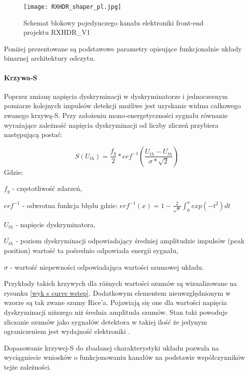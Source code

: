 \begin{figure}
        \texttt{[image: RXHDR\_shaper\_pl.jpg]}
        \caption{Schemat blokowy pojedynczego kanału elektroniki front-end projektu RXHDR\_V1}
        \label{RXHDR schema}
\end{figure}

Poniżej prezentowane są podstawowe parametry opisujące funkcjonalnie układy binarnej architektury odczytu.

\paragraph{Krzywa-S}

Poprzez zmianę napięcia dyskryminacji w dyskryminatorze i jednoczesnym  pomiarze kolejnych impulsów detekcji możliwe jest uzyskanie widma całkowego zwanego krzywą-S. Przy założeniu mono-energetyczności sygnału równanie wyrażające zależność napięcia dyskryminacji od liczby zliczeń przybiera następującą postać:

\begin{equation}
        \label{wste krzywa s}
        S(U_{th}) = \frac{f_g}{2} * erf^{-1}(\frac{U_{th}-\overline{U_{th}}}{\sigma*\sqrt{2}})
\end{equation}
Gdzie:
\begin{description}
        \item $f_g$ - częstotliwość zdarzeń,
        \item $erf^{-1}$ - odwrotna funkcja błędu gdzie: $erf^{-1}(x) = 1 - \frac{2}{\sqrt{\pi}} \int^x_0 exp(-t^2)dt $
        \item $U_{th}$ - napięcie dyskryminatora,
        \item $\overline{U_{th}}$ - poziom dyskryminacji odpowiadający średniej amplitudzie impulsów (peak position) wartość ta pośrednio odpowiada energii sygnału, 
        \item  $\sigma$ - wartość niepewności odpowiadająca wartości szumowej układu. 
\end{description}

Przykłady takich krzywych dla różnych wartości szumów są wizualizowane na rysunku \ref{wyk s curve wstep}. Dodatkowym elementem nieuwzględnionym w wzorze są tak zwane szumy Rice’a. Pojawiają się one dla wartości napięcia dyskryminacji niższego niż średnia amplituda szumów. Stan taki powoduje zliczanie szumów jako sygnałów detektora w takiej ilość że jedynym ograniczeniem jest wydajność elektroniki \cite{wiocek doctorat}.

Dopasowanie krzywej-S do zbadanej charakterystyki układu pozwala na wyciągniecie wniosków o funkcjonowaniu kanałów na podstawie współczynników tejże zależności.   

